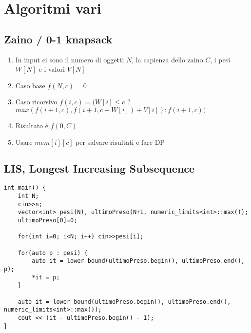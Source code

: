 \section{Algoritmi vari}

\subsection{Zaino / 0-1 knapsack}
\begin{enumerate}
    \item In input ci sono il numero di oggetti $N$, la capienza dello zaino $C$, i pesi $W[N]$ e i valori $V[N]$
    \item Caso base $f(N,c) = 0$
    \item Caso ricorsivo $f(i,c) = (W[i] \leq c$ ? $max(f(i+1, c), f(i+1, c-W[i]) + V[i]) : f(i+1, c))$
    \item Risultato è $f(0,C)$
    \item Usare $mem[i][c]$ per salvare risultati e fare DP
\end{enumerate}

\subsection{LIS, Longest Increasing Subsequence}
\begin{lstlisting}
int main() {
    int N;
    cin>>n;
    vector<int> pesi(N), ultimoPreso(N+1, numeric_limits<int>::max());
    ultimoPreso[0]=0;

    for(int i=0; i<N; i++) cin>>pesi[i];

    for(auto p : pesi) {
        auto it = lower_bound(ultimoPreso.begin(), ultimoPreso.end(), p);
        *it = p;
    }

    auto it = lower_bound(ultimoPreso.begin(), ultimoPreso.end(), numeric_limits<int>::max());
    cout << (it - ultimoPreso.begin() - 1);
}
\end{lstlisting}

